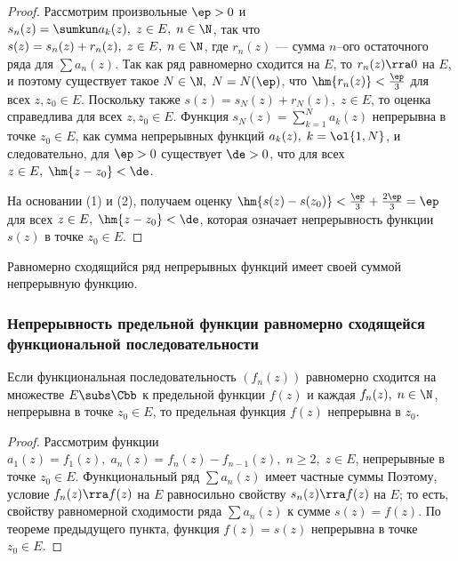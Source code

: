 \documentclass[a4paper]{article}
\newenvironment{imp*}{\par\vskip\theoremskip\textbf{Следствие.}\normalfont \itshape}{\par\vskip\theoremskip}
\begin{document}
\begin{proof}
Рассмотрим произвольные $\ep>0$ и $s_n(z) = \sumkun a_k(z), \; z\in
E, \; n\in\N$, так что $s(z) = s_n(z) + r_n(z), \; z\in E, \;
n\in\N$, где $r_n(z)$ --- сумма $n$--ого остаточного ряда для $\sum
a_n(z)$. Так как ряд равномерно сходится на $E$, то $r_n(z)\rra0$ на
$E$, и поэтому существует такое $N\in\N, \; N=N(\ep)$, что
$\hm{r_n(z)} < \frac{\ep}3$ для всех $z,z_0\in E$. Поскольку также
$s(z) = s_N(z) + r_N(z), \; z\in E$, то оценка
 справедлива
для всех $z,z_0\in E$. Функция $s_N(z) = \sum\limits_{k=1}^N a_k(z)$
непрерывна в точке $z_0\in E$, как сумма непрерывных функций
$a_k(z), \; k=\ol{1,N}$, и следовательно, для $\ep>0$ существует
$\de>0$, что  для всех
$z\in E, \; \hm{z-z_0}<\de$.

На основании (1) и (2), получаем оценку $\hm{s(z) - s(z_0)} <
\frac{\ep}3 + \frac{2\ep}3 = \ep$ для всех $z\in E, \;
\hm{z-z_0}<\de$, которая означает непрерывность функции $s(z)$ в
точке $z_0\in E$.
\end{proof}

\begin{imp*}
Равномерно сходящийся ряд непрерывных функций имеет своей суммой
непрерывную функцию.
\end{imp*}

\subsubsection{Непрерывность предельной функции равномерно сходящейся
функциональной последовательности} %

\begin{theorem}
Если функциональная последовательность $(f_n(z))$ равномерно
сходится на множестве $E\subs\Cbb$ к предельной функции $f(z)$ и
каждая $f_n(z), \; n\in\N$, непрерывна в точке $z_0\in E$, то
предельная функция $f(z)$ непрерывна в $z_0$.
\end{theorem}

\begin{proof}
Рассмотрим функции $a_1(z) = f_1(z), \; a_n(z) = f_n(z) -
f_{n-1}(z), \; n\ge2, \; z\in E$, непрерывные в точке $z_0\in E$.
Функциональный ряд $\sum a_n(z)$ имеет частные суммы  Поэтому, условие $f_n(z)\rra f(z)$ на
$E$ равносильно свойству $s_n(z)\rra f(z)$ на $E$; то есть, свойству
равномерной сходимости ряда $\sum a_n(z)$ к сумме $s(z)=f(z)$. По
теореме предыдущего пункта, функция $f(z)=s(z)$ непрерывна в точке
$z_0\in E$.
\end{proof}
\end{document}
